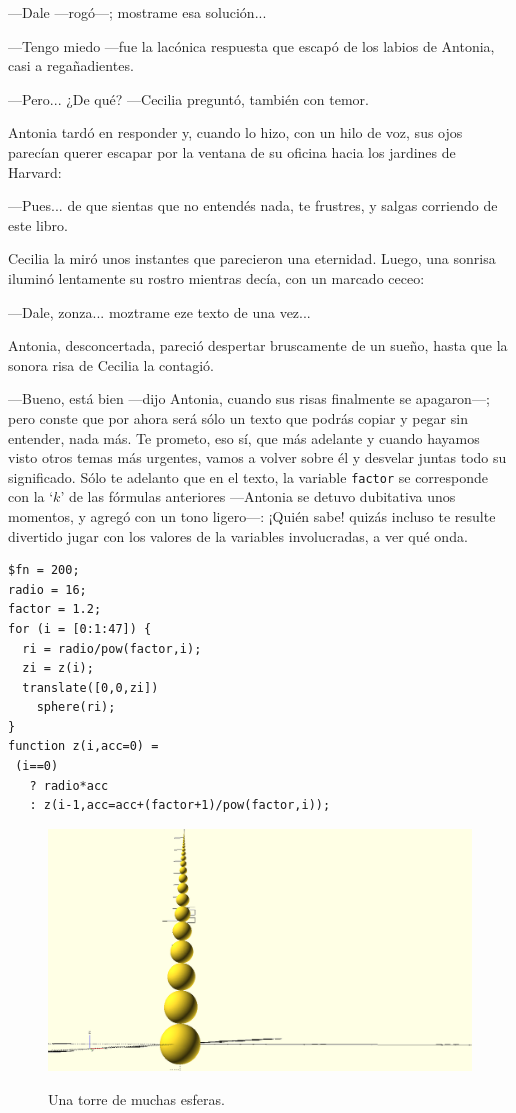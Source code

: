 ---Dale ---rogó---; mostrame esa solución...

---Tengo miedo ---fue la lacónica respuesta que escapó de los labios
de Antonia, casi a regañadientes.

---Pero... ¿De qué? ---Cecilia preguntó, también con temor.

Antonia tardó en responder y, cuando lo hizo, con un hilo de voz, sus
ojos parecían querer escapar por la ventana de su oficina hacia los
jardines de Harvard:

---Pues... de que sientas que no entendés nada, te frustres, y salgas
corriendo de este libro.

Cecilia la miró unos instantes que parecieron una eternidad. Luego,
una sonrisa iluminó lentamente su rostro mientras decía, con un
marcado ceceo:

---Dale, zonza... moztrame eze texto de una
vez...

Antonia, desconcertada, pareció despertar bruscamente de un sueño,
hasta que la sonora risa de Cecilia la contagió.

---Bueno, está bien ---dijo Antonia, cuando sus risas finalmente se
apagaron---; pero conste que por ahora será sólo un texto que podrás
copiar y pegar sin entender, nada más. Te prometo, eso sí, que más
adelante y cuando hayamos visto otros temas más urgentes, vamos a
volver sobre él y desvelar juntas todo su significado. Sólo te
adelanto que en el texto, la variable \texttt{factor} se corresponde
con la `$k$' de las fórmulas anteriores ---Antonia se detuvo
dubitativa unos momentos, y agregó con un tono ligero---: ¡Quién sabe!
quizás incluso te resulte divertido jugar con los valores de la
variables involucradas, a ver qué onda.

    \begin{lstlisting}
$fn = 200;
radio = 16;
factor = 1.2;
for (i = [0:1:47]) {
  ri = radio/pow(factor,i);
  zi = z(i);
  translate([0,0,zi])
    sphere(ri);
}  
function z(i,acc=0) =
 (i==0) 
   ? radio*acc 
   : z(i-1,acc=acc+(factor+1)/pow(factor,i));
    \end{lstlisting}%



    \begin{figure}[ht]
      \centering
      \includegraphics[width=.95\textwidth]{imagenes/muchas-esferas}      
      \caption{Una torre de muchas esferas.}\iftoggle{libro}{}{\vspace{128in}}
      \label{fig:muchas-esferas}
    \end{figure}

